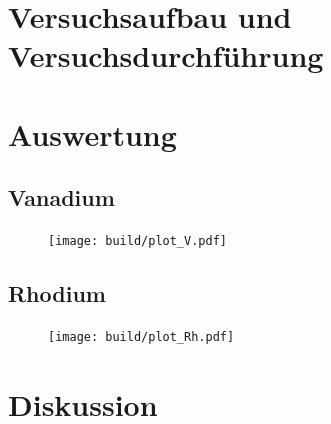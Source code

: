 
\section{Versuchsaufbau und Versuchsdurchführung}\justifying


\section{Auswertung}

\subsection{Vanadium}%

\begin{figure}
    \centering
    \texttt{[image: build/plot\_V.pdf]}
    \caption{} %
    \label{fig:a} %
\end{figure}

\subsection{Rhodium} %

\begin{figure}
    \centering
    \texttt{[image: build/plot\_Rh.pdf]}
    \caption{} %
    \label{fig:b} %
\end{figure}


\section{Diskussion}



\newpage
\printbibliography

